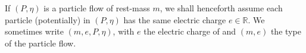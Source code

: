 If $(P, \eta)$ is a particle flow of rest-mass $m$, we shall henceforth assume each particle (potentially) in $(P, \eta)$ has the same electric charge $e \in \mathbb{R}$. We sometimes write $(m, e, P, \eta)$, with $e$ the electric charge of and $(m, e)$ the type of the particle flow.
